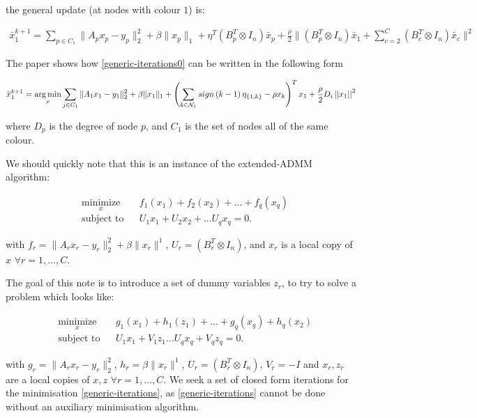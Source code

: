 \documentclass{article}
\begin{document}
the general update (at nodes with colour \(1\)) is:

\begin{align}
\bar{x}_1^{k+1} = \sum_{p \in C_1} \|A_px_p - y_p\|_2^2 + \beta\|x_p\|_1 + \eta^T\left(B_p^T \otimes I_n\right)\bar{x}_p + \frac{\rho}{2}\|\left(B_p^T \otimes I_n\right)\bar{x}_1 + \sum_{c=2}^C \left(B_c^T \otimes I_n\right)\bar{x}_c\|^2
\label{generic-iterations0}
\end{align}

The paper \cite[P.3]{mota2013d} shows how \eqref{generic-iterations0} can be written in the following form

\begin{align}
\bar{x}_1^{k+1} = \operatorname*{arg\,min}_x \sum_{j \in C_1} \|A_1x_1 - y_1\|_2^2 + \beta\|x_1\|_1 + \left(\sum_{k \in \mathcal{N}_1} sign\left(k-1\right)\eta_{\{1,k\}} - \rho x_k \right)^T x_1 + \frac{\rho}{2}D_i\left|\left|x_1\right|\right|^2 
\label{generic-iterations}
\end{align}

where \(D_p\) is the degree of node \(p\), and \(C_1\) is the set of nodes all of the same colour. 

We should quickly note that this is an instance of the extended-ADMM algorithm:

\begin{equation*}
\begin{aligned}
& \underset{x}{\text{minimize}}
& & f_1(x_1) + f_2(x_2) + \ldots + f_q(x_q) \\
& \text{subject to}
& & U_1x_1 + U_2x_2 + \ldots U_qx_q = 0.
\end{aligned}
\end{equation*}

with \(f_r = \|A_rx_r -y_r\|_2^2 + \beta\|x_r\|^1\), \(U_r = \left(B_r^T \otimes I_n\right)\), and \(x_r\) is a local copy of \(x\) \(\forall r = 1,\ldots,C\).

The goal of this note is to introduce a set of dummy variables \(z_r\), to try to solve a problem which looks like:

\begin{equation*}
\begin{aligned}
& \underset{x}{\text{minimize}}
& & g_1(x_1) + h_1(z_1)  + \ldots + g_q(x_q) + h_q(x_2) \\
& \text{subject to}
& & U_1x_1 + V_1z_1 \ldots U_qx_q + V_qz_q = 0.
\end{aligned}
\end{equation*}

with \(g_r = \|A_rx_r -y_r\|_2^2\), \(h_r = \beta\|x_r\|^1\), \(U_r = \left(B_r^T \otimes I_n\right)\), \(V_r = -I\) and \(x_r, z_r\) are a local copies of \(x,z\) \(\forall r = 1,\ldots,C\). We seek a set of closed form iterations for the minimisation \eqref{generic-iterations}, as \eqref{generic-iterations} cannot be done without an auxiliary minimisation algorithm.
\end{document}
